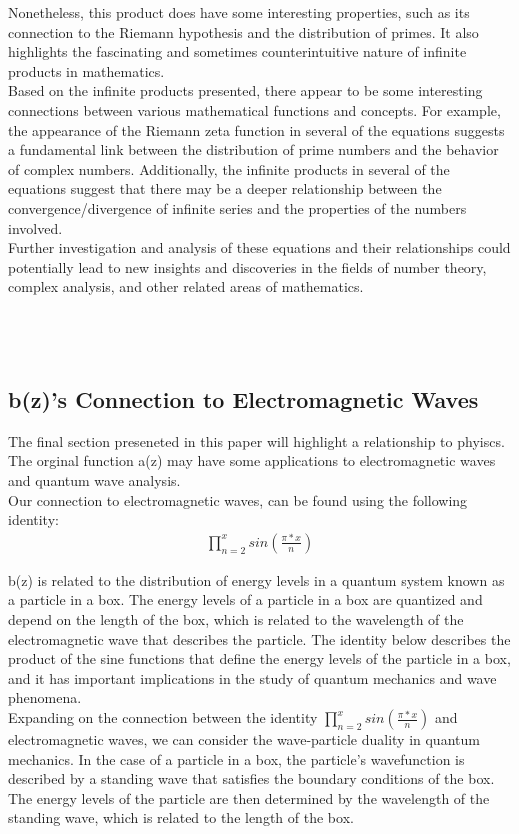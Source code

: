 \documentclass{article}
\begin{document}
Nonetheless, this product does have some interesting properties, such as its connection to the Riemann hypothesis and the distribution of primes. It also highlights the fascinating and sometimes counterintuitive nature of infinite products in mathematics. \\

Based on the infinite products presented, there appear to be some interesting connections between various mathematical functions and concepts. For example, the appearance of the Riemann zeta function in several of the equations suggests a fundamental link between the distribution of prime numbers and the behavior of complex numbers. Additionally, the infinite products in several of the equations suggest that there may be a deeper relationship between the convergence/divergence of infinite series and the properties of the numbers involved. \\

Further investigation and analysis of these equations and their relationships could potentially lead to new insights and discoveries in the fields of number theory, complex analysis, and other related areas of mathematics. \\
\\
\\
\\
\subsection*{b(z)'s Connection to Electromagnetic Waves}
The final section preseneted in this paper will highlight a relationship to phyiscs. The orginal function a(z) may have some applications to electromagnetic waves and quantum wave analysis. \\

Our connection to electromagnetic waves, can be found using the following identity: \\

\begin{align*}
\prod_{n=2}^{x} sin\left(\frac{\pi*x}{n}\right) 
\end{align*}

b(z) is related to the distribution of energy levels in a quantum system known as a particle in a box. The energy levels of a particle in a box are quantized and depend on the length of the box, which is related to the wavelength of the electromagnetic wave that describes the particle. The identity below describes the product of the sine functions that define the energy levels of the particle in a box, and it has important implications in the study of quantum mechanics and wave phenomena. \\
Expanding on the connection between the identity $\prod_{n=2}^{x} sin\left(\frac{\pi*x}{n}\right) $ and electromagnetic waves, we can consider the wave-particle duality in quantum mechanics. In the case of a particle in a box, the particle's wavefunction is described by a standing wave that satisfies the boundary conditions of the box. The energy levels of the particle are then determined by the wavelength of the standing wave, which is related to the length of the box. \\
\end{document}
